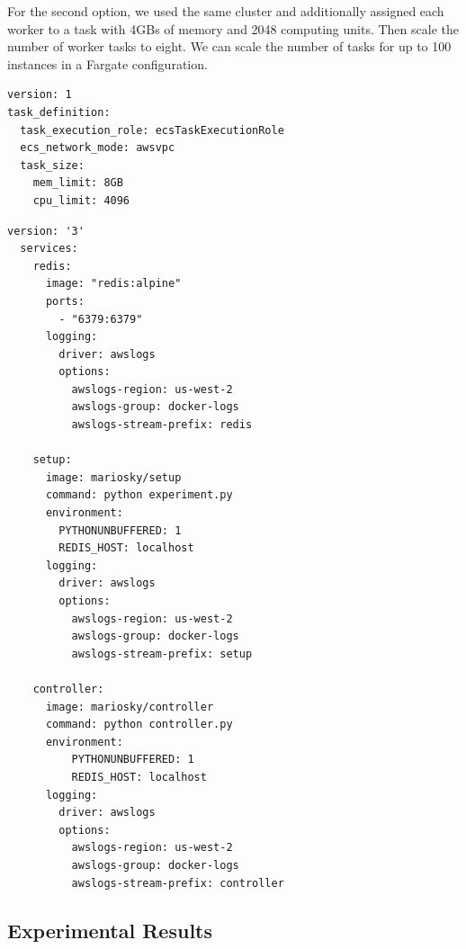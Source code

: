 \documentclass[review]{elsarticle}
\begin{document}
For the second option, we used the same cluster and additionally
assigned each worker to a task with 4GBs of memory and 2048 computing units. Then scale the 
number of worker tasks to eight. We can scale the number of tasks for up to 100 instances in 
a Fargate configuration. 

\begin{lstlisting}[caption=ecs-params.yml , label=code:ecs]
version: 1
task_definition:
  task_execution_role: ecsTaskExecutionRole
  ecs_network_mode: awsvpc
  task_size:
    mem_limit: 8GB
    cpu_limit: 4096
\end{lstlisting}

\begin{lstlisting}[caption={docker-compose.yml for setup, controller and redis containers}, label=code:compose]
  version: '3'
  services:
    redis:
      image: "redis:alpine"
      ports:
        - "6379:6379"
      logging:
        driver: awslogs
        options:
          awslogs-region: us-west-2
          awslogs-group: docker-logs
          awslogs-stream-prefix: redis
  
    setup:
      image: mariosky/setup
      command: python experiment.py
      environment:
        PYTHONUNBUFFERED: 1
        REDIS_HOST: localhost
      logging:
        driver: awslogs
        options:
          awslogs-region: us-west-2
          awslogs-group: docker-logs
          awslogs-stream-prefix: setup
        
    controller:
      image: mariosky/controller
      command: python controller.py
      environment:
          PYTHONUNBUFFERED: 1
          REDIS_HOST: localhost
      logging:
        driver: awslogs
        options:
          awslogs-region: us-west-2
          awslogs-group: docker-logs
          awslogs-stream-prefix: controller
  \end{lstlisting}
\subsection{Experimental Results} 
\end{document}
